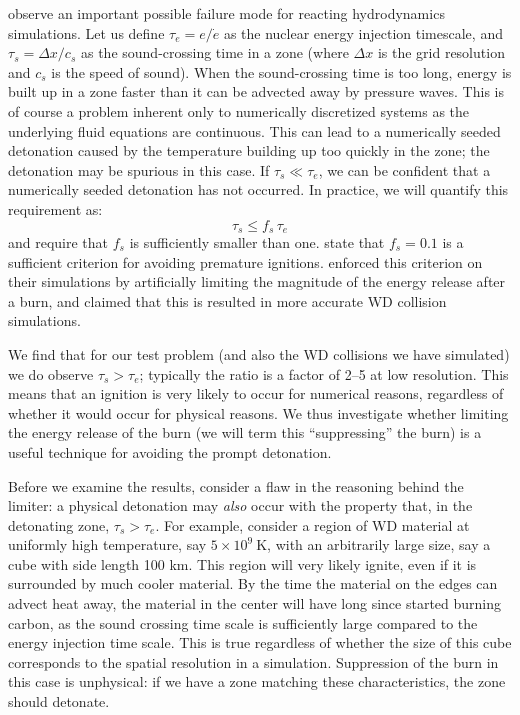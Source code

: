 \documentclass[twocolumn,numberedappendix]{../aastex62}
\begin{document}
\citet{kushnir:2013} observe an important possible failure mode
for reacting hydrodynamics simulations. Let us define $\tau_e = e / \dot{e}$
as the nuclear energy injection timescale, and $\tau_s = \Delta x / c_s$
as the sound-crossing time in a zone (where $\Delta x$ is the grid
resolution and $c_s$ is the speed of sound). When the sound-crossing
time is too long, energy is built up in a zone faster than it can be
advected away by pressure waves. This is of course a problem inherent
only to numerically discretized systems as the underlying fluid equations
are continuous. This can lead to a numerically seeded detonation
caused by the temperature building up too quickly in the zone; the
detonation may be spurious in this case. If $\tau_s \ll \tau_e$,
we can be confident that a numerically seeded detonation has not
occurred. In practice, we will quantify this requirement as:
\begin{equation}
  \tau_s \leq f_{s}\, \tau_e \label{eq:burning_limiter}
\end{equation}
and require that $f_{s}$ is sufficiently smaller than one.
\citet{kushnir:2013} state that $f_{s} = 0.1$ is a sufficient
criterion for avoiding premature ignitions. \citeauthor{kushnir:2013}
enforced this criterion on their simulations by artificially limiting
the magnitude of the energy release after a burn, and claimed that
this is resulted in more accurate WD collision simulations.

We find that for our test problem (and also the WD collisions we have simulated)
we do observe $\tau_s > \tau_e$; typically the ratio is a factor of 2--5 at
low resolution. This means that an ignition is very likely to occur for numerical
reasons, regardless of whether it would occur for physical reasons. We thus
investigate whether limiting the energy release of the burn (we will term this
``suppressing'' the burn) is a useful technique for avoiding the prompt detonation.

Before we examine the results, consider a flaw in the reasoning behind the limiter:
a physical detonation may \textit{also} occur with the property that, in the detonating
zone, $\tau_s > \tau_e$. For example, consider a region of WD material at uniformly
high temperature, say $5 \times 10^9\ \text{K}$, with an arbitrarily large size,
say a cube with side length 100 km. This region will very likely ignite,
even if it is surrounded by much cooler material. By the time the material on
the edges can advect heat away, the material in the center will have long since
started burning carbon, as the sound crossing time scale is sufficiently large
compared to the energy injection time scale. This is true regardless of whether
the size of this cube corresponds to the spatial resolution in a simulation.
Suppression of the burn in this case is unphysical: if we have a zone matching
these characteristics, the zone should detonate.
\end{document}
